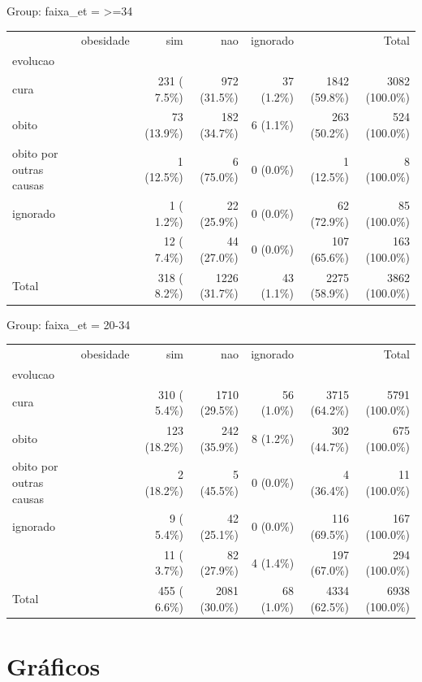 \documentclass[
  letterpaper,
  DIV=11,
  numbers=noendperiod]{scrreprt}
\begin{document}
Group: faixa\_et = \textgreater=34

\begin{longtable}[]{@{}lrrrrrr@{}}
\toprule()
\endhead
& obesidade & sim & nao & ignorado & & Total \\
evolucao & & & & & & \\
cura & & 231 ( 7.5\%) & 972 (31.5\%) & 37 (1.2\%) & 1842 (59.8\%) & 3082
(100.0\%) \\
obito & & 73 (13.9\%) & 182 (34.7\%) & 6 (1.1\%) & 263 (50.2\%) & 524
(100.0\%) \\
obito por outras causas & & 1 (12.5\%) & 6 (75.0\%) & 0 (0.0\%) & 1
(12.5\%) & 8 (100.0\%) \\
ignorado & & 1 ( 1.2\%) & 22 (25.9\%) & 0 (0.0\%) & 62 (72.9\%) & 85
(100.0\%) \\
& & 12 ( 7.4\%) & 44 (27.0\%) & 0 (0.0\%) & 107 (65.6\%) & 163
(100.0\%) \\
Total & & 318 ( 8.2\%) & 1226 (31.7\%) & 43 (1.1\%) & 2275 (58.9\%) &
3862 (100.0\%) \\
\bottomrule()
\end{longtable}

Group: faixa\_et = 20-34

\begin{longtable}[]{@{}lrrrrrr@{}}
\toprule()
\endhead
& obesidade & sim & nao & ignorado & & Total \\
evolucao & & & & & & \\
cura & & 310 ( 5.4\%) & 1710 (29.5\%) & 56 (1.0\%) & 3715 (64.2\%) &
5791 (100.0\%) \\
obito & & 123 (18.2\%) & 242 (35.9\%) & 8 (1.2\%) & 302 (44.7\%) & 675
(100.0\%) \\
obito por outras causas & & 2 (18.2\%) & 5 (45.5\%) & 0 (0.0\%) & 4
(36.4\%) & 11 (100.0\%) \\
ignorado & & 9 ( 5.4\%) & 42 (25.1\%) & 0 (0.0\%) & 116 (69.5\%) & 167
(100.0\%) \\
& & 11 ( 3.7\%) & 82 (27.9\%) & 4 (1.4\%) & 197 (67.0\%) & 294
(100.0\%) \\
Total & & 455 ( 6.6\%) & 2081 (30.0\%) & 68 (1.0\%) & 4334 (62.5\%) &
6938 (100.0\%) \\
\bottomrule()
\end{longtable}

\hypertarget{gruxe1ficos}{%
\section{Gráficos}\label{gruxe1ficos}}
\end{document}
